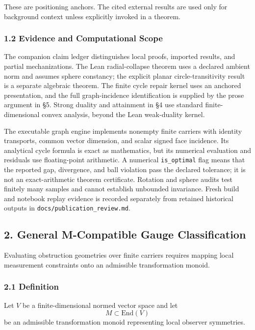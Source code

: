 \documentclass[
  11pt,
]{article}
\begin{document}
These are positioning anchors. The cited external results are used only
for background context unless explicitly invoked in a theorem.

\subsubsection{1.2 Evidence and Computational
Scope}\label{evidence-and-computational-scope}

The companion claim ledger distinguishes local proofs, imported results,
and partial mechanizations. The Lean radial-collapse theorem uses a
declared ambient norm and assumes sphere constancy; the explicit planar
circle-transitivity result is a separate algebraic theorem. The finite
cycle repair kernel uses an anchored presentation, and the full
graph-incidence identification is supplied by the prose argument in §5.
Strong duality and attainment in §4 use standard finite-dimensional
convex analysis, beyond the Lean weak-duality kernel.

The executable graph engine implements nonempty finite carriers with
identity transports, common vector dimension, and scalar signed face
incidence. Its analytical cycle formula is exact as mathematics, but its
numerical evaluation and residuals use floating-point arithmetic. A
numerical \texttt{is\_optimal} flag means that the reported gap,
divergence, and ball violation pass the declared tolerance; it is not an
exact-arithmetic theorem certificate. Rotation and sphere audits test
finitely many samples and cannot establish unbounded invariance. Fresh
build and notebook replay evidence is recorded separately from retained
historical outputs in \texttt{docs/publication\_review.md}.

\subsection{2. General M-Compatible Gauge
Classification}\label{general-m-compatible-gauge-classification}

Evaluating obstruction geometries over finite carriers requires mapping
local measurement constraints onto an admissible transformation monoid.

\subsubsection{2.1 Definition}\label{definition}

Let \(V\) be a finite-dimensional normed vector space and let
\[M \subset \text{End}(V)\] be an admissible transformation monoid
representing local observer symmetries.
\end{document}
